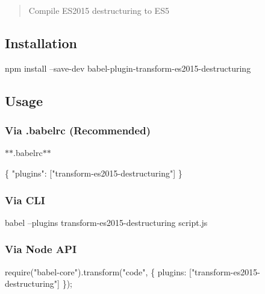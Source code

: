 \begin{quote}
Compile E\+S2015 destructuring to E\+S5 \end{quote}


\subsection*{Installation}


\begin{DoxyCode}
npm install --save-dev babel-plugin-transform-es2015-destructuring
\end{DoxyCode}


\subsection*{Usage}

\subsubsection*{Via {\ttfamily .babelrc} (Recommended)}

$\ast$$\ast$.babelrc$\ast$$\ast$


\begin{DoxyCode}
\{
  "plugins": ["transform-es2015-destructuring"]
\}
\end{DoxyCode}


\subsubsection*{Via C\+LI}


\begin{DoxyCode}
babel --plugins transform-es2015-destructuring script.js
\end{DoxyCode}


\subsubsection*{Via Node A\+PI}


\begin{DoxyCode}
require("babel-core").transform("code", \{
  plugins: ["transform-es2015-destructuring"]
\});
\end{DoxyCode}
 